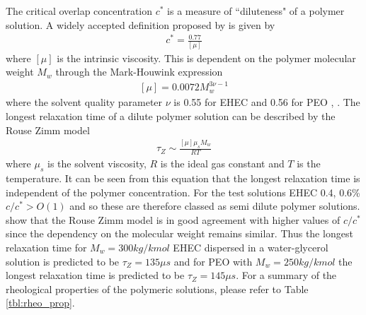 \documentclass[11pt]{article}
\begin{document}
The critical overlap concentration $c^*$ is a measure of ``diluteness" of a 
polymer solution. A widely accepted definition proposed by 
\cite{graessley1980polymer} is given by 
\begin{align}
c^* = \frac{0.77}{\left[ \mu \right]}
\end{align}
where $\left[ \mu \right]$ is the intrinsic viscosity. This is dependent on the 
polymer molecular weight $M_w$ through the Mark-Houwink expression
\begin{align}
\left[\mu \right] = 0.0072 M_w^{3 \nu - 1}
\end{align}
where the solvent quality parameter $\nu$ is 0.55 for EHEC and 0.56 for PEO 
\citep{keshavarz2015studying}, \citep{sharma2015rheology}. The longest 
relaxation time of a dilute polymer solution can be described by the Rouse Zimm 
model
\begin{align}
\tau_{Z} \sim \frac{\left[\mu \right] \mu_s M_w}{RT}
\end{align}
where $\mu_s$ is the solvent viscosity, $R$ is the ideal gas constant and $T$ 
is the temperature. It can be seen from this equation that the longest 
relaxation time is independent of the polymer concentration. For the test 
solutions EHEC 0.4, 0.6\% $c/c^* > O(1)$ and so these are therefore classed as 
semi dilute polymer solutions. \cite{tirtaatmadja2006drop} show that the Rouse 
Zimm model is in good agreement with higher values of $c/c^*$ since the 
dependency on the molecular weight remains similar. Thus the longest relaxation 
time for $M_w = 300 kg/kmol$ EHEC dispersed in a water-glycerol solution is 
predicted to be $\tau_{Z} = 135 \mu s$ and for PEO with $M_w = 250 kg/kmol$ the 
longest relaxation time is predicted to be $\tau_Z = 145 \mu s$. For a summary 
of the rheological properties of the polymeric solutions, please refer to Table 
\ref{tbl:rheo_prop}. 
\end{document}
